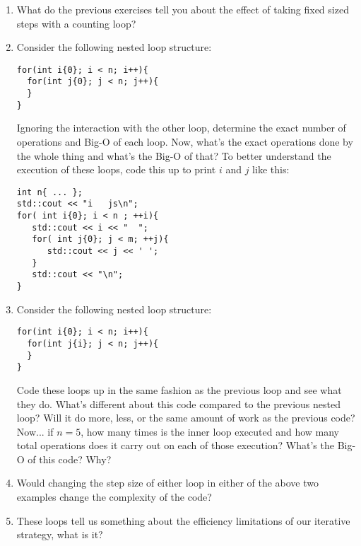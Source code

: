 \documentclass[10pt]{article}
\begin{document}
\begin{enumerate}
\item What do the previous exercises tell you about the effect of taking fixed sized steps with a counting loop? 
\vspace{3in}

\item Consider the following nested loop structure:
\begin{lstlisting}
for(int i{0}; i < n; i++){
  for(int j{0}; j < n; j++){  
  }
}
\end{lstlisting}
Ignoring the interaction with the other loop, determine the exact number of operations and Big-O of each loop. Now, what's the exact operations done by the whole thing and what's the Big-O of that? To better understand the execution of these loops, code this up to print $i$ and $j$ like this:
\begin{lstlisting}
int n{ ... };
std::cout << "i   js\n";
for( int i{0}; i < n ; ++i){
   std::cout << i << "  ";
   for( int j{0}; j < m; ++j){
      std::cout << j << ' ';
   }
   std::cout << "\n";
}
\end{lstlisting}
\newpage \thispagestyle{empty}

\item Consider the following nested loop structure:
\begin{lstlisting}
for(int i{0}; i < n; i++){
  for(int j{i}; j < n; j++){  
  }
}
\end{lstlisting}
Code these loops up in the same fashion as the previous loop and see what they do. What's different about this code compared to the previous nested loop? Will it do more, less, or the same amount of work as the previous code? Now... if $n=5$, how many times is the inner loop executed and how many total operations does it carry out on each of those execution? What's the Big-O of this code? Why? 
\vspace{2in}
\item Would changing the step size of either loop in either of the above two examples change the complexity of the code?
\vspace{2in}
\item These loops tell us something about the efficiency limitations of our iterative strategy, what is it? 
\end{enumerate}
\end{document}
